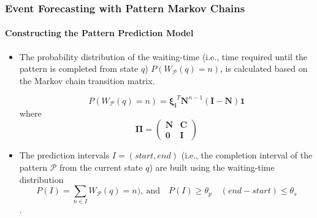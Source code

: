 \frame
{
	\frametitle{Event Forecasting with Pattern Markov
		Chains}
	\framesubtitle{Constructing the Pattern Prediction Model}
	\begin{itemize}
		
		\item<only@1> The probability distribution of the waiting-time (i.e., time required until the pattern is completed from state $q$) $P(W_{\mathcal{P}}(q)=n)$, is calculated based on the Markov chain transition matrix. 
	
		\begin{equation*}
		P(W_{\mathcal{P}}(q)=n)=\boldsymbol{\xi_{i}}^{T}\boldsymbol{N}^{n-1}(\boldsymbol{I}-\boldsymbol{N})\boldsymbol{1} 
		\end{equation*}
		where 
		\begin{equation}
		\label{eq:matrix}
		\boldsymbol{\Pi} = 
		\begin{pmatrix} 
		\boldsymbol{N} & \boldsymbol{C}  \\ 
		\boldsymbol{0} & \boldsymbol{I}
		\end{pmatrix}
		\end{equation}
		\item<only@1> The prediction intervals $I=(\mathit{start},\mathit{end})$ (i.e., the completion interval of the pattern $\mathcal{P}$ from the  current state $q$) are built using the waiting-time distribution $$P(I)=\sum_{n \in I}{W_{\mathcal{P}}(q)=n)} ,\ \textrm{and} \quad P(I) \geq  \theta_{p} \quad (end -start)\leq \theta_{s} $$. 
			
	\end{itemize}
}


